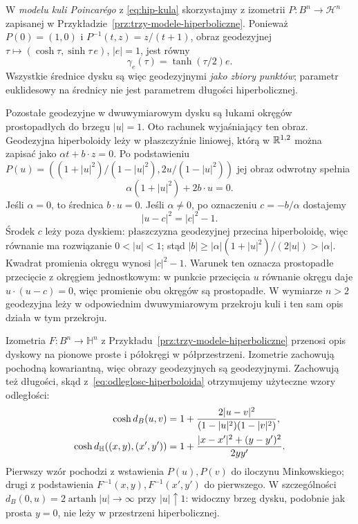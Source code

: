 \begin{przyklad}
W \emph{modelu kuli Poincarégo} z
\eqref{eq:hip-kula} skorzystajmy z izometrii
$P:B^n\to\mathcal H^n$ zapisanej w
Przykładzie~\ref{prz:trzy-modele-hiperboliczne}.
Ponieważ $P(0)=(1,0)$ i
$P^{-1}(t,z)=z/(t+1)$, obraz geodezyjnej
$\tau\mapsto(\cosh\tau,\sinh\tau\,e)$,
$|e|=1$, jest równy
\begin{equation}\label{eq:geodezyjna-dysk-radialna}
 \gamma_e(\tau)=\tanh(\tau/2)e.
\end{equation}
Wszystkie średnice dysku są więc geodezyjnymi
\emph{jako zbiory punktów}; parametr euklidesowy
na średnicy nie jest parametrem długości hiperbolicznej.

Pozostałe geodezyjne w dwuwymiarowym dysku są
łukami okręgów prostopadłych do brzegu $|u|=1$.
Oto rachunek wyjaśniający ten obraz. Geodezyjna
hiperboloidy leży w płaszczyźnie liniowej, którą
w $\mathbb{R}^{1,2}$ można zapisać jako
$\alpha t+b\cdot z=0$. Po podstawieniu
$P(u)=((1+|u|^2)/(1-|u|^2),2u/(1-|u|^2))$
jej obraz odwrotny spełnia
\[
 \alpha(1+|u|^2)+2b\cdot u=0.
\]
Jeśli $\alpha=0$, to średnica $b\cdot u=0$.
Jeśli $\alpha\ne0$, po oznaczeniu $c=-b/\alpha$
dostajemy
\begin{equation}\label{eq:geodezyjna-dysk-okrag}
 |u-c|^2=|c|^2-1.
\end{equation}
Środek $c$ leży poza dyskiem: płaszczyzna geodezyjnej
przecina hiperboloidę, więc równanie ma rozwiązanie
$0<|u|<1$; stąd
$|b|\geq |\alpha|(1+|u|^2)/(2|u|)>|\alpha|$.
Kwadrat promienia
okręgu wynosi $|c|^2-1$. Warunek ten oznacza
prostopadłe przecięcie z okręgiem jednostkowym:
w punkcie przecięcia $u$ równanie okręgu daje
$u\cdot(u-c)=0$, więc promienie obu okręgów
są prostopadłe. W wymiarze $n>2$ geodezyjna
leży w odpowiednim dwuwymiarowym przekroju
kuli i ten sam opis działa w tym przekroju.

Izometria $F:B^n\to\mathbb H^n$ z
Przykładu~\ref{prz:trzy-modele-hiperboliczne}
przenosi opis dyskowy na pionowe proste
i półokręgi w półprzestrzeni. Izometrie
zachowują pochodną kowariantną, więc obrazy
geodezyjnych są geodezyjnymi. Zachowują też
długości, skąd z~\eqref{eq:odleglosc-hiperboloida}
otrzymujemy użyteczne wzory odległości:
\begin{align}\label{eq:odleglosci-modele-hiperboliczne}
 \cosh d_B(u,v)
  &=1+\frac{2|u-v|^2}
      {(1-|u|^2)(1-|v|^2)},\\
 \cosh d_{\mathbb H}((x,y),(x',y'))
  &=1+\frac{|x-x'|^2+(y-y')^2}{2yy'}.\notag
\end{align}
Pierwszy wzór pochodzi z wstawienia $P(u),P(v)$
do iloczynu Minkowskiego; drugi z podstawienia
$F^{-1}(x,y),F^{-1}(x',y')$ do pierwszego.
W szczególności
$d_B(0,u)=2\operatorname{artanh}|u|\to\infty$
przy $|u|\uparrow1$: widoczny brzeg dysku,
podobnie jak prosta $y=0$, nie leży w przestrzeni
hiperbolicznej.
\end{przyklad}

